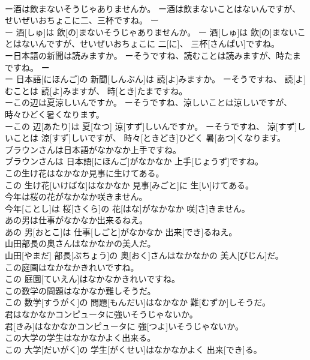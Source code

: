\documentclass[8pt]{extreport}
\begin{document}
\begin{CJK}{UTF8}{min}
\\	ー酒は飲まないそうじゃありませんか。 ー酒は飲まないことはないんですが、せいぜいおちょこに二、三杯ですね。	ー
\\	ー 酒[しゅ]は 飲[の]まないそうじゃありませんか。 ー 酒[しゅ]は 飲[の]まないことはないんですが、せいぜいおちょこに 二[に]、 三杯[さんぱい]ですね。
\\	ー日本語の新聞は読みますか。 ーそうですね、読むことは読みますが、時たまですね。	ー
\\	ー 日本語[にほんご]の 新聞[しんぶん]は 読[よ]みますか。 ーそうですね、 読[よ]むことは 読[よ]みますが、 時[とき]たまですね。
\\	ーこの辺は夏涼しいんですか。 ーそうですね、涼しいことは涼しいですが、時々ひどく暑くなります。	
\\	ーこの 辺[あたり]は 夏[なつ] 涼[すず]しいんですか。 ーそうですね、 涼[すず]しいことは 涼[すず]しいですが、 時々[ときどき]ひどく 暑[あつ]くなります。
\\	ブラウンさんは日本語がなかなか上手ですね。	
\\	ブラウンさんは 日本語[にほんご]がなかなか 上手[じょうず]ですね。
\\	この生け花はなかなか見事に生けてある。	
\\	この 生け花[いけばな]はなかなか 見事[みごと]に 生[い]けてある。
\\	今年は桜の花がなかなか咲きません。	
\\	今年[ことし]は 桜[さくら]の 花[はな]がなかなか 咲[さ]きません。
\\	あの男は仕事がなかなか出来るねえ。	
\\	あの 男[おとこ]は 仕事[しごと]がなかなか 出来[でき]るねえ。
\\	山田部長の奥さんはなかなかの美人だ。	
\\	山田[やまだ] 部長[ぶちょう]の 奥[おく]さんはなかなかの 美人[びじん]だ。
\\	この庭園はなかなかきれいですね。	
\\	この 庭園[ていえん]はなかなかきれいですね。
\\	この数学の問題はなかなか難しそうだ。	
\\	この 数学[すうがく]の 問題[もんだい]はなかなか 難[むずか]しそうだ。
\\	君はなかなかコンピュータに強いそうじゃないか。	
\\	君[きみ]はなかなかコンピュータに 強[つよ]いそうじゃないか。
\\	この大学の学生はなかなかよく出来る。	
\\	この 大学[だいがく]の 学生[がくせい]はなかなかよく 出来[でき]る。

\end{CJK}
\end{document}
